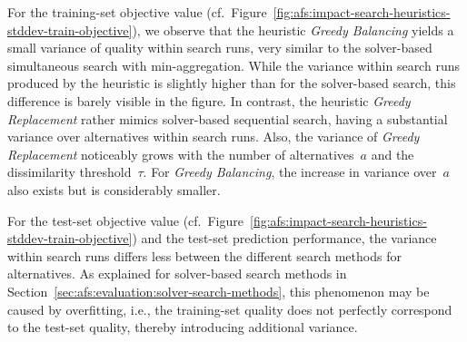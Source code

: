 \documentclass{article}
\theoremstyle{definition}
\begin{document}
For the training-set objective value (cf.~Figure~\ref{fig:afs:impact-search-heuristics-stddev-train-objective}), we observe that the heuristic \emph{Greedy Balancing} yields a small variance of quality within search runs, very similar to the solver-based simultaneous search with min-aggregation.
While the variance within search runs produced by the heuristic is slightly higher than for the solver-based search, this difference is barely visible in the figure.
In contrast, the heuristic \emph{Greedy Replacement} rather mimics solver-based sequential search, having a substantial variance over alternatives within search runs.
Also, the variance of \emph{Greedy Replacement} noticeably grows with the number of alternatives~$a$ and the dissimilarity threshold~$\tau$.
For \emph{Greedy Balancing}, the increase in variance over~$a$ also exists but is considerably smaller.

For the test-set objective value (cf.~Figure~\ref{fig:afs:impact-search-heuristics-stddev-train-objective}) and the test-set prediction performance, the variance within search runs differs less between the different search methods for alternatives.
As explained for solver-based search methods in Section~\ref{sec:afs:evaluation:solver-search-methods}, this phenomenon may be caused by overfitting, i.e., the training-set quality does not perfectly correspond to the test-set quality, thereby introducing additional variance.
\end{document}
